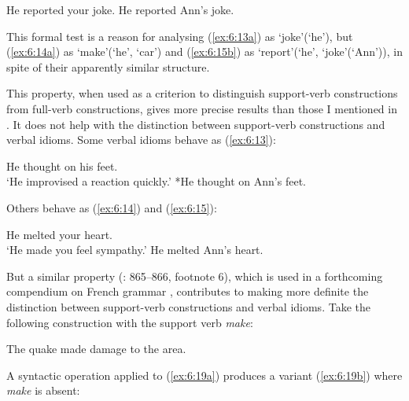 \documentclass[output=paper]{langsci/langscibook}
\begin{document}
\begin{exe}
\ex \label{ex:6:15}
\begin{xlist}
\ex \label{ex:6:15a}	
He reported your joke.
\ex \label{ex:6:15b}
He reported Ann’s joke.
\end{xlist}
\end{exe}

\noindent This formal test is a reason for analysing (\ref{ex:6:13a}) as ‘joke’(‘he’), but (\ref{ex:6:14a}) as ‘make’(‘he’, ‘car’) and (\ref{ex:6:15b}) as ‘report’(‘he’, ‘joke’(‘Ann’)), in spite of their apparently similar structure.

This property, when used as a criterion to distinguish support-verb constructions from full-verb constructions, gives more precise results than those I mentioned in . It does not help with the distinction between support-verb constructions and verbal idioms. Some verbal idioms behave as (\ref{ex:6:13}):

\begin{exe}
\ex \label{ex:6:16}
\begin{xlist}
\ex \label{ex:6:16a}
He thought on his feet.\\
‘He improvised a reaction quickly.’
\ex \label{ex:6:16b}
*He thought on Ann’s feet.
\end{xlist}
\end{exe}

\noindent Others behave as (\ref{ex:6:14}) and (\ref{ex:6:15}): 

\begin{exe}
\ex \label{ex:6:17}
\begin{xlist}
\ex \label{ex:6:17a}
He melted your heart.\\
‘He made you feel sympathy.’
\ex \label{ex:6:17b}
He melted Ann’s heart.
\end{xlist}
\end{exe}
	 

\noindent But a similar property (\citealt{Gross1979}: 865–866, footnote 6), which is used in a forthcoming compendium on French grammar \citep[16]{Abeille2011}, contributes to making more definite the distinction between support-verb constructions and verbal idioms. Take the following construction with the support verb \textit{make}: 

\begin{exe}
\ex \label{ex:6:18}
The quake made damage to the area.
\end{exe}
	 

\noindent A syntactic operation applied to (\ref{ex:6:19a}) produces a variant (\ref{ex:6:19b}) where \textit{make} is absent:
\end{document}
